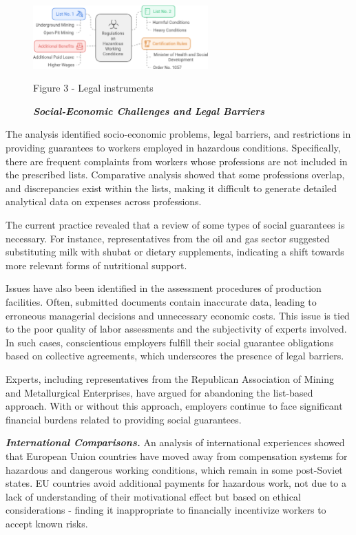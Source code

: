 \begin{figure}[H]
	\centering
	\includegraphics[width=0.6\textwidth]{media/gorn/image4}
	\caption*{Figure 3 - Legal instruments}
	\caption*{\emph{{\bfseries Social-Economic Challenges and Legal Barriers}}}
\end{figure}

\begin{multicols}{2}
The analysis identified socio-economic problems, legal barriers, and
restrictions in providing guarantees to workers employed in hazardous
conditions. Specifically, there are frequent complaints from workers
whose professions are not included in the prescribed lists. Comparative
analysis showed that some professions overlap, and discrepancies exist
within the lists, making it difficult to generate detailed analytical
data on expenses across professions.

The current practice revealed that a review of some types of social
guarantees is necessary. For instance, representatives from the oil and
gas sector suggested substituting milk with shubat or dietary
supplements, indicating a shift towards more relevant forms of
nutritional support.

Issues have also been identified in the assessment procedures of
production facilities. Often, submitted documents contain inaccurate
data, leading to erroneous managerial decisions and unnecessary economic
costs. This issue is tied to the poor quality of labor assessments and
the subjectivity of experts involved. In such cases, conscientious
employers fulfill their social guarantee obligations based on collective
agreements, which underscores the presence of legal barriers.

Experts, including representatives from the Republican Association of
Mining and Metallurgical Enterprises, have argued for abandoning the
list-based approach. With or without this approach, employers continue
to face significant financial burdens related to providing social
guarantees.

\emph{{\bfseries International Comparisons.}} An analysis of international
experiences showed that European Union countries have moved away from
compensation systems for hazardous and dangerous working conditions,
which remain in some post-Soviet states. EU countries avoid additional
payments for hazardous work, not due to a lack of understanding of their
motivational effect but based on ethical considerations - finding it
inappropriate to financially incentivize workers to accept known risks.


\end{multicols}
